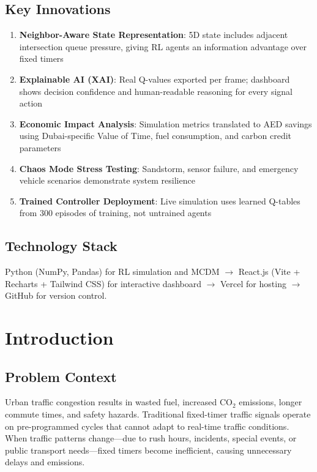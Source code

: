 \documentclass[12pt, a4paper]{article}
\begin{document}
\subsection{Key Innovations}
\begin{enumerate}[nosep]
    \item \textbf{Neighbor-Aware State Representation}: 5D state includes adjacent intersection queue pressure, giving RL agents an information advantage over fixed timers
    \item \textbf{Explainable AI (XAI)}: Real Q-values exported per frame; dashboard shows decision confidence and human-readable reasoning for every signal action
    \item \textbf{Economic Impact Analysis}: Simulation metrics translated to AED savings using Dubai-specific Value of Time, fuel consumption, and carbon credit parameters
    \item \textbf{Chaos Mode Stress Testing}: Sandstorm, sensor failure, and emergency vehicle scenarios demonstrate system resilience
    \item \textbf{Trained Controller Deployment}: Live simulation uses learned Q-tables from 300 episodes of training, not untrained agents
\end{enumerate}

\subsection{Technology Stack}
Python (NumPy, Pandas) for RL simulation and MCDM $\rightarrow$ React.js (Vite + Recharts + Tailwind CSS) for interactive dashboard $\rightarrow$ Vercel for hosting $\rightarrow$ GitHub for version control.

\newpage

\section{Introduction}

\subsection{Problem Context}

Urban traffic congestion results in wasted fuel, increased CO$_2$ emissions, longer commute times, and safety hazards. Traditional fixed-timer traffic signals operate on pre-programmed cycles that cannot adapt to real-time traffic conditions. When traffic patterns change---due to rush hours, incidents, special events, or public transport needs---fixed timers become inefficient, causing unnecessary delays and emissions.
\end{document}
